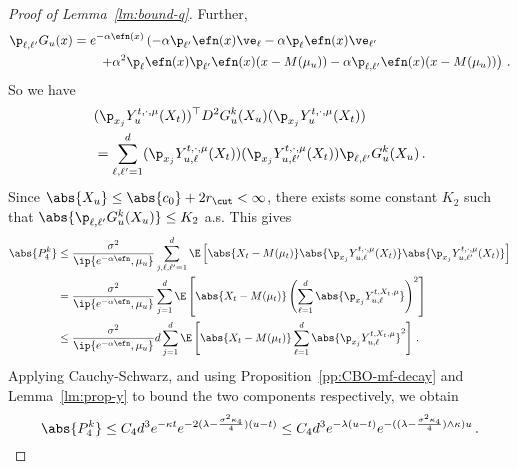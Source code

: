 \documentclass{amsart}
\begin{document}
\begin{proof}[Proof of Lemma~\ref{lm:bound-q}]
	Further, 
	\begin{align*}
		\p_{\ell,\ell'} G_u(x) & = e^{-\alpha \efn(x)} \left(-\alpha \p_{\ell'} \efn(x) \ve_\ell - \alpha \p_\ell \efn(x) \ve_{\ell'} \right. \\
		& \qquad \left. +\alpha^2 \p_\ell \efn(x) \p_{\ell'} \efn(x) (x-M(\mu_u)) - \alpha \p_{\ell,\ell'} \efn(x) (x-M(\mu_u)) \right) \,.
	\end{align*}
	So we have 
	\begin{align*}
		& (\p_{x_j} Y^{t,\cdot,\mu}_u (X_t))^\top D^2 G^k_u(X_u) (\p_{x_j} Y^{t,\cdot,\mu}_u(X_t)) \\
		& = \sum_{\ell,\ell'=1}^d (\p_{x_j} Y^{t,\cdot,\mu}_{u,\ell} (X_t)) (\p_{x_j} Y^{t,\cdot,\mu}_{u,\ell'} (X_t)) \p_{\ell,\ell'} G^k_u(X_u)\,.
	\end{align*}
	Since $\abs{X_u} \le \abs{c_0} + 2r_\cut < \infty$, there exists some constant $K_2$ such that $\abs{\p_{\ell,\ell'} G^k_u(X_u)} \le K_2$ a.s.
	This gives 
	\begin{align*}
		\abs{P^k_4} & \le \frac{\sigma^2}{\ip{e^{-\alpha\efn},\mu_u}} \sum_{j,\ell,\ell'=1}^d \E \left[ \abs{X_t - M(\mu_t)} \abs{\p_{x_j} Y^{t,\cdot,\mu}_{u,\ell} (X_t)} \abs{\p_{x_j} Y^{t,\cdot,\mu}_{u,\ell'} (X_t)} \right] \\
		& = \frac{\sigma^2}{\ip{e^{-\alpha\efn},\mu_u}} \sum_{j=1}^d \E \left[ \abs{X_t - M(\mu_t)} \left( \sum_{\ell=1}^d \abs{\p_{x_j} Y^{t,X_t,\mu}_{u,\ell}} \right)^2 \right] \\
		& \le \frac{\sigma^2}{\ip{e^{-\alpha\efn},\mu_u}} d \sum_{j=1}^d \E \left[ \abs{X_t-M(\mu_t)} \sum_{\ell=1}^d \abs{\p_{x_j} Y^{t,X_t,\mu}_{u,\ell}}^2 \right] \,.
	\end{align*}
	Applying Cauchy-Schwarz, and using Proposition~\ref{pp:CBO-mf-decay} and Lemma~\ref{lm:prop-y} to bound the two components respectively, we obtain 
	\begin{equation*}
		\abs{P^k_4} \le C_4 d^3 e^{-\kappa t} e^{-2(\lambda - \frac{\sigma^2 \kappa_4}{4}) (u-t)} \le C_4 d^3 e^{-\lambda(u-t)} e^{-((\lambda-\frac{\sigma^2 \kappa_4}{4}) \land \kappa) u} \,. 
	\end{equation*}


\end{proof}
\end{document}
